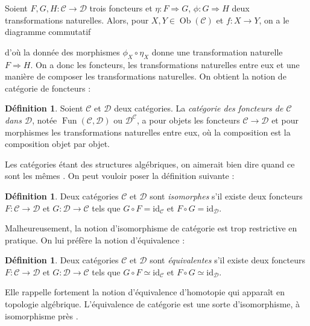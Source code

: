 \documentclass{article}
\newcommand{\id}{\mathrm{id}}
\newcommand{\cat}{\mathcal{C}}
\newcommand{\catt}{\mathcal{D}}
\DeclareMathOperator{\Ob}{Ob}
\DeclareMathOperator{\Fun}{Fun}
\theoremstyle{plain}
\theoremstyle{definition}
\newtheorem{definition}[theorem]{Définition}
\theoremstyle{remark}
\begin{document}
Soient $F,G,H : \cat \to \catt$ trois foncteurs et $\eta : F \Rightarrow G$, $\phi : G\Rightarrow H$ deux transformations naturelles. Alors, pour $X,Y \in \Ob(\cat)$ et $f : X \to Y$, on a le diagramme commutatif
\begin{center}
\end{center}
d'où la donnée des morphismes $\phi_X\circ \eta_X$ donne une transformation naturelle $F \Rightarrow H$. On a donc les foncteurs, les transformations naturelles entre eux et une manière de composer les transformations naturelles. On obtient la notion de catégorie de foncteurs :

\begin{definition}
    Soient $\cat$ et $\catt$ deux catégories. La \emph{catégorie des foncteurs de $\cat$ dans $\catt$}, notée $\Fun(\cat,\catt)$ ou $\catt^\cat$, a pour objets les foncteurs $\cat \to \catt$ et pour morphismes les transformations naturelles entre eux, où la composition est la composition \og objet par objet\fg.
\end{definition}

Les catégories étant des structures algébriques, on aimerait bien dire quand ce sont \og les mêmes \fg. On peut vouloir poser la définition suivante :

\begin{definition}
    Deux catégories $\cat$ et $\catt$ sont \emph{isomorphes} s'il existe deux foncteurs $F : \cat \to \catt$ et $G : \catt \to \cat$ tels que $G \circ F = \id_\cat$ et $F \circ G = \id_\catt$.
\end{definition}

Malheureusement, la notion d'isomorphisme de catégorie est trop restrictive en pratique. On lui préfère la notion d'équivalence :

\begin{definition}
    Deux catégories $\cat$ et $\catt$ sont \emph{équivalentes} s'il existe deux foncteurs $F : \cat \to \catt$ et $G : \catt \to \cat$ tels que $G \circ F \simeq \id_\cat$ et $F \circ G \simeq \id_\catt$.
\end{definition}

Elle rappelle fortement la notion d'équivalence d'homotopie qui apparaît en topologie algébrique. L'équivalence de catégorie est une sorte d'\og isomorphisme, à isomorphisme près \fg.
\end{document}
